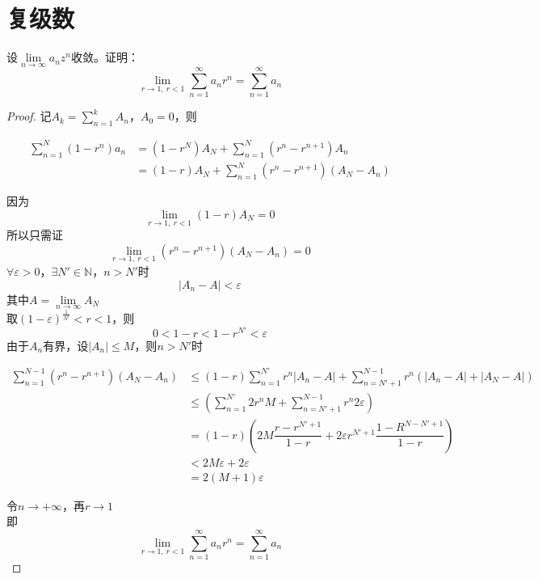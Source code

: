 \section{复级数}

\begin{proposition}

    设$\lim\limits_{n \to \infty}{a_nz^n}$收敛。证明：
    $$\lim\limits_{r \to 1, \ r < 1}{\sum\limits_{n = 1}^{\infty}{a_nr^n}} = \sum\limits_{n = 1}^{\infty}{a_n}$$

\end{proposition}

\begin{proof}
    
    记$A_k = \sum\limits_{n = 1}^{k}{A_n}$，$A_0 = 0$，则

    \begin{align*}
        \sum\limits_{n = 1}^{N}{(1 - r^n)a_n} & = (1 - r^N)A_N + \sum\limits_{n = 1}^{N}{(r^n - r^{n + 1})A_n} \\
        & = (1 - r)A_N + \sum\limits_{n = 1}^{N}{(r^n - r^{n + 1})(A_N - A_n)}
    \end{align*}

    因为
    $$\lim\limits_{r \to 1, \ r < 1}{(1 - r)A_N} = 0$$
    所以只需证
    $$\lim\limits_{r \to 1, \ r < 1}{(r^n - r^{n + 1})(A_N - A_n)} = 0$$
    $\forall \varepsilon > 0 $，$\exists N' \in \mathbb{N}$，$n > N'$时
    $$|A_n - A| < \varepsilon $$
    其中$A = \lim\limits_{n \to \infty}{A_N}$ \\
    取$(1 - \varepsilon)^{\frac{1}{N'}} < r < 1$，则
    $$0 < 1 - r < 1 - r^{N'} < \varepsilon $$
    由于$A_n$有界，设$|A_n| \leq M $，则$n > N'$时
    
    \begin{align*}
        \sum\limits_{n = 1}^{N - 1}{(r^n - r^{n + 1})(A_N - A_n)} & \leq (1 - r)\sum\limits_{n = 1}^{N'}{r^n|A_n - A|} + \sum\limits_{n = N' + 1}^{N - 1}{r^n(|A_n - A| + |A_N - A|)} \\
        & \leq (\sum\limits_{n = 1}^{N'}{2r^nM} + \sum\limits_{n = N' + 1}^{N - 1}{r^n2\varepsilon}) \\
        & = (1 - r)\left( 2M\dfrac{r - r^{N' + 1}}{1 - r} + 2\varepsilon r^{N' + 1}\dfrac{1 - R^{N - N' + 1}}{1 - r} \right) \\
        & < 2M\varepsilon + 2\varepsilon \\
        & = 2(M + 1)\varepsilon
    \end{align*}

    令$n \to +\infty$，再$r \to 1$ \\
    即
    $$\lim\limits_{r \to 1, \ r < 1}{\sum\limits_{n = 1}^{\infty}{a_nr^n}} = \sum\limits_{n = 1}^{\infty}{a_n}$$

\end{proof}

